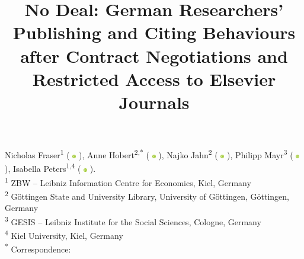 \title{\vspace{-2em}No Deal: German Researchers' Publishing and Citing Behaviours after Contract Negotiations and Restricted Access to Elsevier Journals\vspace{-3em}}
\date{}

\newcommand{\orcid}{%
  \begingroup\normalfont
  \includegraphics[height=6px]{./assets/orcid_logo.png}%
  \endgroup
}
Nicholas Fraser\textsuperscript{1} (\orcid{} \href{https://orcid.org/0000-0002-7582-6339}{\color{black}{0000-0002-7582-6339}}), Anne Hobert\textsuperscript{2,*} (\orcid{} \href{https://orcid.org/0000-0003-2429-2995}{\color{black}{0000-0003-2429-2995}}), Najko Jahn\textsuperscript{2} (\orcid{} \href{https://orcid.org/0000-0001-5105-1463}{\color{black}{0000-0001-5105-1463}}), Philipp Mayr\textsuperscript{3} (\orcid{} \href{https://orcid.org/0000-0002-6656-1658}{\color{black}{0000-0002-6656-1658}}), Isabella Peters\textsuperscript{1,4} (\orcid{} \href{https://orcid.org/0000-0001-5840-0806}{\color{black}{0000-0001-5840-0806}}). \\

\textsuperscript{1} ZBW -- Leibniz Information Centre for Economics, Kiel, Germany \\
\textsuperscript{2} Göttingen State and University Library, University of Göttingen, Göttingen, Germany \\
\textsuperscript{3} GESIS -- Leibniz Institute for the Social Sciences, Cologne, Germany \\
\textsuperscript{4} Kiel University, Kiel, Germany \\

\textsuperscript{*} Correspondence: \href{mailto:hobert@sub.uni-goettingen.de}{\color{black}{hobert@sub.uni-goettingen.de}} 